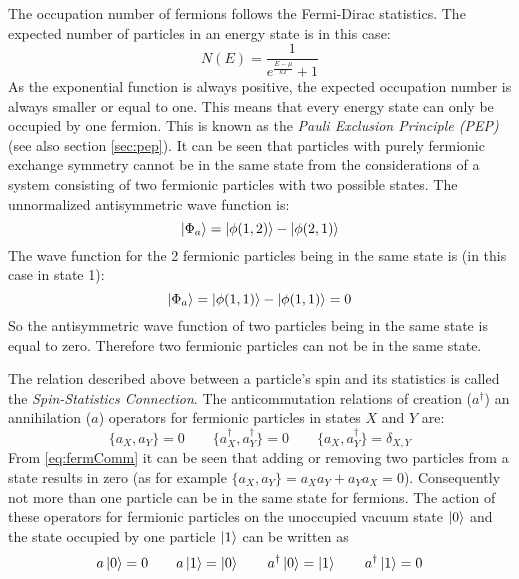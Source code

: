 The occupation number of fermions follows the Fermi-Dirac statistics. The expected number of particles in an energy state is in this case:
\begin{equation}
 N(E) = \frac{1}{e^{\frac{E-\mu}{kT}}+1}
\end{equation} 
As the exponential function is always positive, the expected occupation number is always smaller or equal to one. This means that every energy state can only be occupied by one fermion. This is known as the \textit{Pauli Exclusion Principle (PEP)} (see also section \ref{sec:pep}). It can be seen that particles with purely fermionic exchange symmetry cannot be in the same state from the  considerations of a system consisting of two fermionic particles with two possible states. The unnormalized antisymmetric wave function is:
\begin{equation}
 \ket{\Phi_{a}} = \ket{\phi(1,2)} - \ket{\phi(2,1)} 
\end{equation} 
The wave function for the 2 fermionic particles being in the same state is (in this case in state 1):
\begin{equation}
 \ket{\Phi_{a}} = \ket{\phi(1,1)} - \ket{\phi(1,1)} = 0
\end{equation} 
So the antisymmetric wave function of two particles being in the same state is equal to zero. Therefore two fermionic particles can not be in the same state.

The relation described above between a particle's spin and its statistics is called the \textit{Spin-Statistics Connection}. The anticommutation relations of creation ($a^{\dag}$) an annihilation ($a$) operators for fermionic particles in states $X$ and $Y$ are:
\begin{equation}
\label{eq:fermComm}
 \{a_{X},a_{Y}\} = 0 \hspace{2em} \{a^{\dag}_{X},a^{\dag}_{Y}\} = 0 \hspace{2em} \{a_{X},a^{\dag}_{Y}\} = \delta_{X,Y}
\end{equation} 
From \ref{eq:fermComm} it can be seen that adding or removing two particles from a state results in zero (as for example $\{a_{X},a_{Y}\} = a_{X}a_{Y} + a_{Y}a_{X} = 0$). Consequently not more than one particle can be in the same state for fermions. The action of these operators for fermionic particles on the unoccupied vacuum state $\ket{0}$ and the state occupied by one particle $\ket{1}$ can be written as
\begin{equation}
\label{eq:fermCreatAnnihOp}
 a \ket{0} = 0 \hspace{2em} a \ket{1} = \ket{0} \hspace{2em} a^{\dag} \ket{0} = \ket{1} \hspace{2em} a^{\dag} \ket{1} = 0
\end{equation} 

